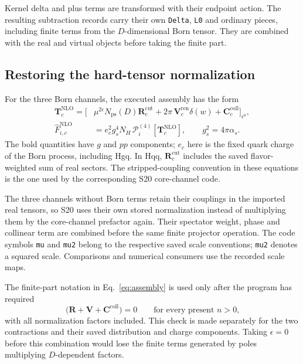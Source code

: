 \documentclass[11pt,a4paper]{article}
\newcommand{\eps}{\epsilon}
\newcommand{\Fhat}{\widehat F}
\newcommand{\NLO}{\mathrm{NLO}}
\newcommand{\cut}{\mathrm{cut}}
\begin{document}
Kernel delta and plus terms are transformed with their endpoint action.
The resulting subtraction records carry their own \texttt{Delta},
\texttt{L0} and ordinary pieces, including finite terms from the
$D$-dimensional Born tensor. They are combined with the real and virtual
objects before taking the finite part.

\subsection{Restoring the hard-tensor normalization}

For the three Born channels, the executed assembly has the form
\begin{align}
 \mathbf T_c^{\NLO}
 =\Big[&\mu^{2\eps}N_{\mathrm{ps}}(D)
                \mathbf R_c^{\cut}
       +2\pi\,\mathbf V_c^{\mathrm{ren}}\delta(w)
       +\mathbf C_c^{\mathrm{coll}}\Big]_{\eps^0},
 \label{eq:assembly}\\
 \Fhat_{i,c}^{\NLO}
 &=e_c^2 g_s^4 N_H\,
          \mathcal P_i^{(4)}[\mathbf T_c^{\NLO}],
 \qquad g_s^2=4\pi\alpha_s.
 \label{eq:assemblyprojection}
\end{align}
The bold quantities have $g$ and $pp$ components; $e_c$ here is the fixed
quark charge of the Born process, including Hgq. In Hqq,
$\mathbf R_c^{\cut}$ includes the saved flavor-weighted sum of real sectors.
The stripped-coupling convention in these equations is the one used by
the corresponding S20 core-channel code.

The three channels without Born terms retain their couplings in the
imported real tensors, so S20 uses their own stored normalization instead
of multiplying them by the core-channel prefactor again. Their spectator
weight, phase and collinear term are combined before the same finite
projector operation. The code symbols \texttt{mu} and \texttt{mu2} belong
to the respective saved scale conventions; \texttt{mu2} denotes a squared
scale. Comparisons and numerical consumers use the recorded scale maps.

The finite-part notation in Eq.~\eqref{eq:assembly} is used only after
the program has required
\begin{equation}
 [\eps^{-n}]\,
 \bigl(\mathbf R+\mathbf V+\mathbf C^{\mathrm{coll}}\bigr)=0
 \qquad\text{for every present }n>0,
 \label{eq:poles}
\end{equation}
with all normalization factors included. This check is made separately
for the two contractions and their saved distribution and charge
components. Taking $\eps=0$ before this combination would lose the finite
terms generated by poles multiplying $D$-dependent factors.
\end{document}
